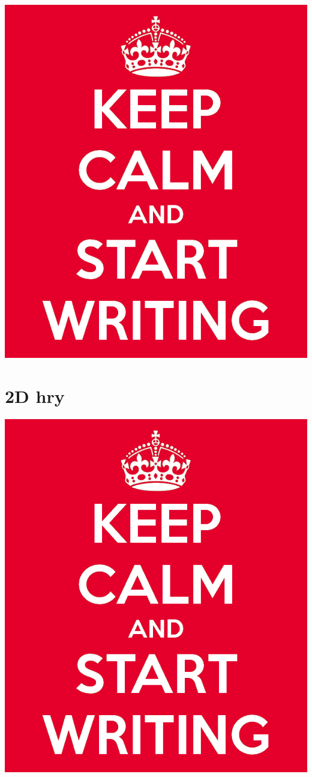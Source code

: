 \includegraphics[scale=0.3]{obrazky-figures/keep-calm.png}

\textcolor{gray}{\blindtext[23]}

\section{2D hry}

\textcolor{gray}{\blindtext[18]}
\includegraphics[scale=0.3]{obrazky-figures/keep-calm.png}

